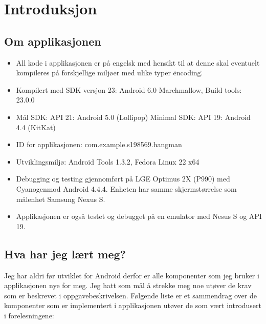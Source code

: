 \chapter{Introduksjon}


\section{Om applikasjonen}
\begin{itemize}
\item All kode i applikasjonen er på engelsk med hensikt til at denne skal eventuelt kompileres på forskjellige miljøer med ulike typer \"encoding\". 
\item Kompilert med SDK versjon 23: Android 6.0 Marchmallow, Build tools: 23.0.0
\item Mål SDK: API 21: Android 5.0 (Lollipop) Minimal SDK: API 19: Android 4.4 (KitKat)
\item ID for applikasjonen: com.example.s198569.hangman
\item Utviklingsmiljø: Android Tools 1.3.2, Fedora Linux 22 x64
\item Debugging og testing gjennomført på LGE Optimus 2X (P990) med Cyanogenmod Android 4.4.4. Enheten har samme skjermstørrelse som målenhet Samsung Nexus S.
\item Applikasjonen er også testet og debugget på en emulator med Nesus S og API 19.
\end{itemize}


\section{Hva har jeg lært meg?}
Jeg har aldri før utviklet for Android derfor er alle komponenter som jeg bruker i applikasjonen nye for meg. Jeg hatt som mål å strekke meg noe utøver de krav som er beskrevet i oppgavebeskrivelsen. Følgende liste er et sammendrag over de komponenter som er implementert i applikasjonen utøver de som vært introdusert i forelesningene:

